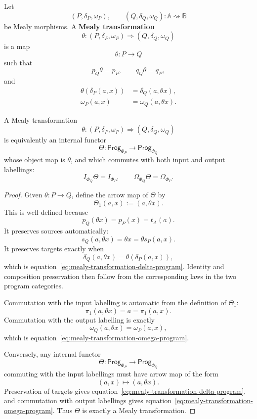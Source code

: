 \begin{definition}
\label{def:mealy-transformation-program-chapter}
Let
\[
(P,\delta_P,\omega_P),
\qquad
(Q,\delta_Q,\omega_Q)
:
\mathbb A\rightsquigarrow\mathbb B
\]
be Mealy morphisms. A \textbf{Mealy transformation}
\[
\theta:(P,\delta_P,\omega_P)\Rightarrow(Q,\delta_Q,\omega_Q)
\]
is a map
\[
\theta:P\to Q
\]
such that
\[
p_Q\theta=p_P,
\qquad
q_Q\theta=q_P,
\]
and
\begin{align}
\theta(\delta_P(a,x))
&=
\delta_Q(a,\theta x),
\label{eq:mealy-transformation-delta-program}
\\
\omega_P(a,x)
&=
\omega_Q(a,\theta x).
\label{eq:mealy-transformation-omega-program}
\end{align}
\end{definition}

\begin{proposition}
\label{prop:transformations-labelled-functors}
A Mealy transformation
\[
\theta:(P,\delta_P,\omega_P)\Rightarrow(Q,\delta_Q,\omega_Q)
\]
is equivalently an internal functor
\[
\Theta:\mathsf{Prog}_{\Phi_P}\to\mathsf{Prog}_{\Phi_Q}
\]
whose object map is \(\theta\), and which commutes with both input and output labellings:
\[
I_{\Phi_Q}\Theta=I_{\Phi_P},
\qquad
\Omega_{\Phi_Q}\Theta=\Omega_{\Phi_P}.
\]
\end{proposition}

\begin{proof}
Given \(\theta:P\to Q\), define the arrow map of \(\Theta\) by
\[
\Theta_1(a,x):=(a,\theta x).
\]
This is well-defined because
\[
p_Q(\theta x)=p_P(x)=t_A(a).
\]
It preserves sources automatically:
\[
s_Q(a,\theta x)=\theta x=\theta s_P(a,x).
\]
It preserves targets exactly when
\[
\delta_Q(a,\theta x)=\theta(\delta_P(a,x)),
\]
which is equation~\eqref{eq:mealy-transformation-delta-program}. Identity and composition preservation then follow from the corresponding laws in the two program categories.

Commutation with the input labelling is automatic from the definition of \(\Theta_1\):
\[
\pi_1(a,\theta x)=a=\pi_1(a,x).
\]
Commutation with the output labelling is exactly
\[
\omega_Q(a,\theta x)=\omega_P(a,x),
\]
which is equation~\eqref{eq:mealy-transformation-omega-program}.

Conversely, any internal functor
\[
\Theta:\mathsf{Prog}_{\Phi_P}\to\mathsf{Prog}_{\Phi_Q}
\]
commuting with the input labellings must have arrow map of the form
\[
(a,x)\mapsto (a,\theta x).
\]
Preservation of targets gives equation~\eqref{eq:mealy-transformation-delta-program}, and commutation with output labellings gives equation~\eqref{eq:mealy-transformation-omega-program}. Thus \(\Theta\) is exactly a Mealy transformation.
\end{proof}

